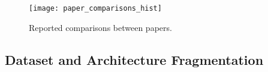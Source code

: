 

\begin{figure}[h]
\begin{center}
\texttt{[image: paper\_comparisons\_hist]}
\caption{Reported comparisons between papers.
}
\label{fig:paper_comparisons_hist}
\end{center}
\end{figure}

\subsection{Dataset and Architecture Fragmentation}


